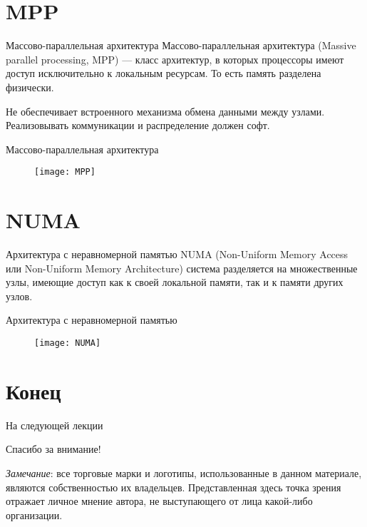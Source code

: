 \section{MPP}

\begin{frame}{Массово-параллельная архитектура}
Массово-параллельная архитектура (\abbr Massive parallel processing, MPP) --- класс архитектур, в которых процессоры имеют доступ исключительно к локальным ресурсам. То есть память разделена физически.

Не обеспечивает встроенного механизма обмена данными между узлами. Реализовывать коммуникации и распределение должен софт.
\end{frame}

\begin{frame}{Массово-параллельная архитектура}
\begin{figure}[htpb]
    \centering
    \texttt{[image: MPP]}
\end{figure}
\end{frame}

\section{NUMA}

\begin{frame}{Архитектура с неравномерной памятью}
NUMA (Non-Uniform Memory Access или Non-Uniform Memory Architecture) система разделяется на множественные узлы, имеющие доступ как к своей локальной памяти, так и к памяти других узлов.
\end{frame}

\begin{frame}{Архитектура с неравномерной памятью}
\begin{figure}[htpb]
    \centering
    \texttt{[image: NUMA]}
\end{figure}
\end{frame}

\section*{Конец}

\begin{frame}{На следующей лекции}
\end{frame}

\begin{frame}

{\huge{Спасибо за внимание!}\par}

\vfill

\tiny{\textit{Замечание}: все торговые марки и логотипы, использованные в данном материале, являются собственностью их владельцев. Представленная здесь точка зрения отражает личное мнение автора, не выступающего от лица какой-либо организации.}

\end{frame}


